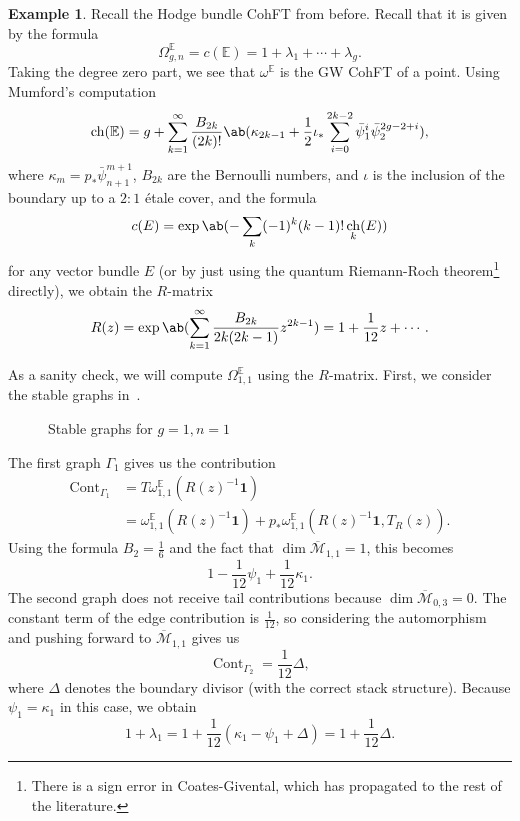 \documentclass{amsart}
\theoremstyle{definition}
\newtheorem{exm}[thm]{Example}
\theoremstyle{remark}
\theoremstyle{plain}
\theoremstyle{definition}
\theoremstyle{remark}
\newcommand{\E}{\mathbb{E}}
\newcommand{\Mbar}{\overline{\mathcal{M}}}
\newcommand{\1}{\mathbf{1}}
\newcommand{\2}{\mathbf{2}}
\newcommand{\3}{\mathbf{3}}
\DeclareMathOperator{\ch}{ch}
\DeclareMathOperator{\Cont}{Cont}
\begin{document}
\begin{exm}
    Recall the Hodge bundle CohFT from before. Recall that it is given by the formula
    \[ \Omega^{\E}_{g,n} = c(\E) = 1 + \lambda_1 + \cdots + \lambda_g. \]
    Taking the degree zero part, we see that $\omega^{\E}$ is the GW CohFT of a point. Using Mumford's computation
    \[ \ch(\E) = g + \sum_{k=1}^{\infty} \frac{B_{2k}}{(2k)!}\ab(\kappa_{2k-1} + \frac{1}{2}\iota_*\sum_{i=0}^{2k-2} \bar{\psi}_1^{i} \bar{\psi}_2^{2g-2+i}), \]
    where $\kappa_{m} = p_* \bar{\psi}_{n+1}^{m+1}$, $B_{2k}$ are the Bernoulli numbers, and $\iota$ is the inclusion of the boundary up to a $2:1$ \'etale cover, and the formula
    \[ c(E) = \exp \ab(-\sum_k (-1)^k (k-1)!\ch_k(E)) \]
    for any vector bundle $E$ (or by just using the quantum Riemann-Roch theorem\footnote{There is a sign error in Coates-Givental, which has propagated to the rest of the literature.} directly), we obtain the $R$-matrix
    \[ R(z) = \exp\ab( \sum_{k=1}^{\infty} \frac{B_{2k}}{2k(2k-1)} z^{2k-1}) = 1+\frac{1}{12}z + \cdots. \]

    As a sanity check, we will compute $\Omega_{1,1}^{\E}$ using the $R$-matrix. First, we consider the stable graphs in~.
    \begin{figure}[htpb]
    \begin{center}
    \end{center}
    \caption{Stable graphs for $g=1, n=1$}%
    \label{fig:03graphloop}
    \end{figure}
    The first graph $\Gamma_1$ gives us the contribution
    \begin{align*}
        \Cont_{\Gamma_1} &= T\omega_{1,1}^{\E}(R(z)^{-1}\1) \\
        &= \omega_{1,1}^{\E}(R(z)^{-1}\1) + p_* \omega_{1,1}^{\E}(R(z)^{-1}\1, T_R(z)).
    \end{align*}
    Using the formula $B_2 = \frac{1}{6}$ and the fact that $\dim \Mbar_{1,1} = 1$, this becomes
    \[ 1 - \frac{1}{12}\psi_1 + \frac{1}{12} \kappa_1. \]
    The second graph does not receive tail contributions because $\dim \Mbar_{0,3} = 0$. The constant term of the edge contribution is $\frac{1}{12}$, so considering the automorphism and pushing forward to $\Mbar_{1,1}$ gives us
    \[ \Cont_{\Gamma_2} = \frac{1}{12} \Delta, \]
    where $\Delta$ denotes the boundary divisor (with the correct stack structure). Because $\psi_1 = \kappa_1$ in this case, we obtain
    \[ 1+\lambda_1 = 1 + \frac{1}{12}(\kappa_1 - \psi_1 + \Delta) = 1 + \frac{1}{12} \Delta. \]
\end{exm}
\end{document}
